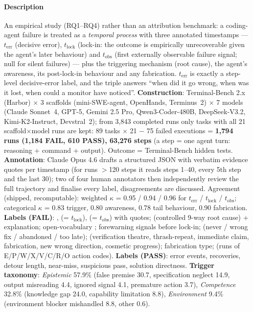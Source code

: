 \paragraph{Description} An empirical study (RQ1--RQ4) rather than an attribution benchmark: a coding-agent failure is treated as a \emph{temporal process} with three annotated timestamps --- $t_{\mathrm{err}}$ (decisive error), $t_{\mathrm{lock}}$ (lock-in: the outcome is empirically unrecoverable given the agent's later behaviour) and $t_{\mathrm{obs}}$ (first externally observable failure signal; null for silent failures) --- plus the triggering mechanism (root cause), the agent's awareness, its post-lock-in behaviour and any fabrication. $t_{\mathrm{err}}$ is exactly a step-level decisive-error label, and the triple answers ``when did it go wrong, when was it lost, when could a monitor have noticed''. \textbf{Construction}: Terminal-Bench 2.x (Harbor) $\times$ 3 scaffolds (mini-SWE-agent, OpenHands, Terminus~2) $\times$ 7 models (Claude Sonnet~4, GPT-5, Gemini 2.5 Pro, Qwen3-Coder-480B, DeepSeek-V3.2, Kimi-K2-Instruct, Devstral~2); from 3,843 completed runs only tasks with all 21 scaffold$\times$model runs are kept: 89 tasks $\times$ 21 $-$ 75 failed executions = \textbf{1,794 runs (1,184 FAIL, 610 PASS), 63,276 steps} (a step = one agent turn: reasoning + command + output). Outcome = Terminal-Bench hidden tests. \textbf{Annotation}: Claude Opus 4.6 drafts a structured JSON with verbatim evidence quotes per timestamp (for runs $>$120 steps it reads steps 1--40, every 5th step and the last 30); two of four human annotators then independently review the full trajectory and finalise every label, disagreements are discussed. Agreement (shipped, recomputable): weighted $\kappa$ = 0.95 / 0.94 / 0.96 for $t_{\mathrm{err}}$ / $t_{\mathrm{lock}}$ / $t_{\mathrm{obs}}$; categorical $\kappa$ = 0.83 trigger, 0.80 awareness, 0.78 tail behaviour, 0.90 fabrication. \textbf{Labels (FAIL)}: ,  (= $t_{\mathrm{lock}}$),  (= $t_{\mathrm{obs}}$) with  quotes;  (controlled 9-way root cause) + explanation; open-vocabulary ; forewarning signals before lock-in;  (never / wrong fix / abandoned / too late);  (verification theatre, thrash-repeat, immediate claim, fabrication, new wrong direction, cosmetic progress); fabrication type;  (runs of E/P/W/X/V/C/R/O action codes). \textbf{Labels (PASS)}: error events, recoveries, detour length, near-miss, suspicious pass, solution directness. \textbf{Trigger taxonomy}: \emph{Epistemic} 57.9\% (false premise 30.7, specification neglect 14.9, output misreading 4.4, ignored signal 4.1, premature action 3.7), \emph{Competence} 32.8\% (knowledge gap 24.0, capability limitation 8.8), \emph{Environment} 9.4\% (environment blocker mishandled 8.8, other 0.6).

